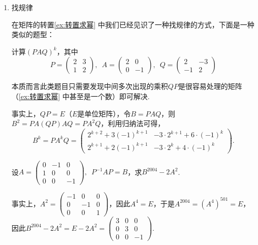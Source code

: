 \begin{enumerate}
    \item 找规律

          在矩阵的转置\autoref{ex:转置求幂} 中我们已经见识了一种找规律的方式，下面是一种类似的题型：
          \begin{example}{}{}
              计算$(PAQ)^k$，其中
              \[P=\begin{pmatrix}2 & 3 \\ 1 & 2\end{pmatrix},\enspace A=\begin{pmatrix}2 & 0 \\ 0 & -1\end{pmatrix},\enspace Q=\begin{pmatrix}2 & -3 \\ -1 & 2\end{pmatrix}\]
          \end{example}
          本质而言此类题目只需要发现中间多次出现的乘积$QP$是很容易处理的矩阵（\autoref{ex:转置求幂} 中甚至是一个数）即可解决.

          \begin{solution}
              事实上，$QP=E$（$E$是单位矩阵），令$B=PAQ$，则$B^2=PA(QP)AQ=PA^2Q$，利用归纳法可得，
              \[B^k=PA^kQ=\begin{pmatrix}
                      2^{k+2}+3(-1)^{k+1} & -3\cdot 2^{k+1}+6\cdot (-1)^k \\
                      2^{k+1}+2(-1)^{k+1} & -3\cdot 2^k+4\cdot (-1)^k
                  \end{pmatrix}.\]
          \end{solution}

          \begin{example}{}{}
              设$A=\begin{pmatrix}0 & -1 & 0 \\ 1 & 0 & 0 \\ 0 & 0 & -1 \end{pmatrix},\enspace P^{-1}AP=B$，求$B^{2004}-2A^2$.
          \end{example}
          \begin{solution}
              事实上，$A^2=\begin{pmatrix}
                      -1 & 0 & 0 \\ 0 & -1 & 0 \\ 0 & 0 & 1
                  \end{pmatrix}$，因此$A^4=E$，于是$A^{2004}=(A^4)^{501}=E$，因此$B^{2004}-2A^2=E-2A^2=\begin{pmatrix}
                      3 & 0 & 0 \\ 0 & 3  & 0 \\ 0 & 0 & -1
                  \end{pmatrix}$.
          \end{solution}


\end{enumerate}

